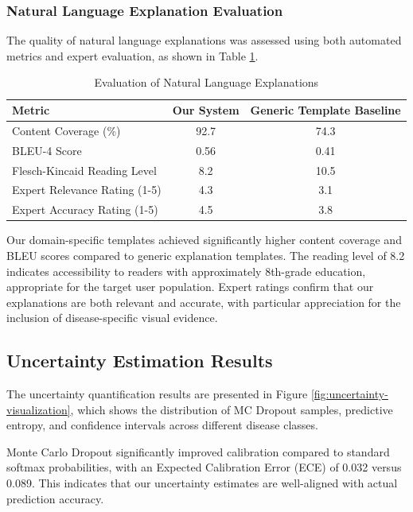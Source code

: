 \subsubsection{Natural Language Explanation Evaluation}

The quality of natural language explanations was assessed using both automated metrics and expert evaluation, as shown in Table \ref{tab:nlg-evaluation}.

\begin{table}[h]
\centering
\caption{Evaluation of Natural Language Explanations}
\label{tab:nlg-evaluation}
\begin{tabular}{lcc}
\hline
\textbf{Metric} & \textbf{Our System} & \textbf{Generic Template Baseline} \\
\hline
Content Coverage (\%) & 92.7 & 74.3 \\
BLEU-4 Score & 0.56 & 0.41 \\
Flesch-Kincaid Reading Level & 8.2 & 10.5 \\
Expert Relevance Rating (1-5) & 4.3 & 3.1 \\
Expert Accuracy Rating (1-5) & 4.5 & 3.8 \\
\hline
\end{tabular}
\end{table}

Our domain-specific templates achieved significantly higher content coverage and BLEU scores compared to generic explanation templates. The reading level of 8.2 indicates accessibility to readers with approximately 8th-grade education, appropriate for the target user population. Expert ratings confirm that our explanations are both relevant and accurate, with particular appreciation for the inclusion of disease-specific visual evidence.

\subsection{Uncertainty Estimation Results}

The uncertainty quantification results are presented in Figure \ref{fig:uncertainty-visualization}, which shows the distribution of MC Dropout samples, predictive entropy, and confidence intervals across different disease classes.

Monte Carlo Dropout significantly improved calibration compared to standard softmax probabilities, with an Expected Calibration Error (ECE) of 0.032 versus 0.089. This indicates that our uncertainty estimates are well-aligned with actual prediction accuracy.

